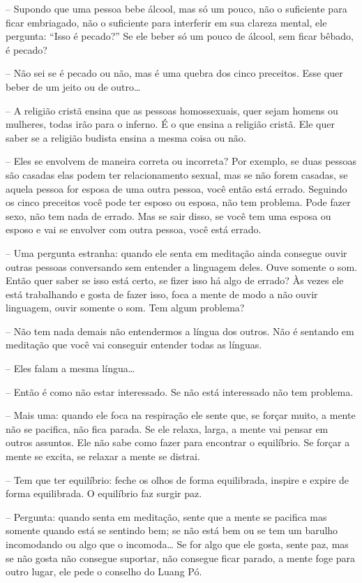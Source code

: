 -- Supondo que uma pessoa bebe álcool, mas só um pouco, não o
suficiente para ficar embriagado, não o suficiente para interferir em
sua clareza mental, ele pergunta: “Isso é pecado?” Se ele beber só um
pouco de álcool, sem ficar bêbado, é pecado?

-- Não sei se é pecado ou não, mas é uma quebra dos cinco
preceitos. Esse quer beber de um jeito ou de outro…

-- A religião cristã ensina que as pessoas homossexuais, quer sejam
homens ou mulheres, todas irão para o inferno. É o que ensina a
religião cristã. Ele quer saber se a religião budista ensina a mesma
coisa ou não.

-- Eles se envolvem de maneira correta ou incorreta? Por exemplo,
se duas pessoas são casadas elas podem ter relacionamento sexual, mas
se não forem casadas, se aquela pessoa for esposa de uma outra pessoa,
você então está errado. Seguindo os cinco preceitos você pode ter
esposo ou esposa, não tem problema. Pode fazer sexo, não tem nada de
errado. Mas se sair disso, se você tem uma esposa ou esposo e vai se
envolver com outra pessoa, você está errado.

-- Uma pergunta estranha: quando ele senta em meditação ainda
consegue ouvir outras pessoas conversando sem entender a linguagem
deles. Ouve somente o som. Então quer saber se isso está certo, se
fizer isso há algo de errado? Às vezes ele está trabalhando e gosta de
fazer isso, foca a mente de modo a não ouvir linguagem, ouvir somente o
som. Tem algum problema?

-- Não tem nada demais não entendermos a língua dos outros. Não é
sentando em meditação que você vai conseguir entender todas as línguas.

-- Eles falam a mesma língua…

-- Então é como não estar interessado. Se não está interessado não
tem problema.

-- Mais uma: quando ele foca na respiração ele sente que, se forçar
muito, a mente não se pacifica, não fica parada. Se ele relaxa, larga,
a mente vai pensar em outros assuntos. Ele não sabe como fazer para
encontrar o equilíbrio. Se forçar a mente se excita, se relaxar a mente
se distrai.

-- Tem que ter equilíbrio: feche os olhos de forma equilibrada,
inspire e expire de forma equilibrada. O equilíbrio faz surgir paz.

-- Pergunta: quando senta em meditação, sente que a mente se
pacifica mas somente quando está se sentindo bem; se não está bem ou se
tem um barulho incomodando ou algo que o incomoda… Se for algo que ele
gosta, sente paz, mas se não gosta não consegue suportar, não consegue
ficar parado, a mente foge para outro lugar, ele pede o conselho do
Luang Pó.


